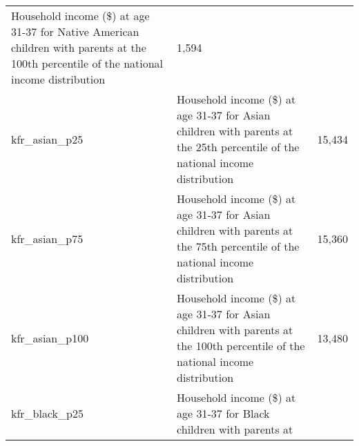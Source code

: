 \documentclass[]{book}
\begin{document}
\begin{longtable}[]{@{}lll@{}}
\begin{minipage}[t]{0.04\columnwidth}
Household income (\$) at age 31-37 for Native American children with
parents at the 100th percentile of the national income
distribution\strut
\end{minipage} & \begin{minipage}[t]{0.04\columnwidth}\raggedright\strut
1,594\strut
\end{minipage}\tabularnewline
\begin{minipage}[t]{0.04\columnwidth}\raggedright\strut
kfr\_asian\_p25\strut
\end{minipage} & \begin{minipage}[t]{0.04\columnwidth}\raggedright\strut
Household income (\$) at age 31-37 for Asian children with parents at
the 25th percentile of the national income distribution\strut
\end{minipage} & \begin{minipage}[t]{0.04\columnwidth}\raggedright\strut
15,434\strut
\end{minipage}\tabularnewline
\begin{minipage}[t]{0.04\columnwidth}\raggedright\strut
kfr\_asian\_p75\strut
\end{minipage} & \begin{minipage}[t]{0.04\columnwidth}\raggedright\strut
Household income (\$) at age 31-37 for Asian children with parents at
the 75th percentile of the national income distribution\strut
\end{minipage} & \begin{minipage}[t]{0.04\columnwidth}\raggedright\strut
15,360\strut
\end{minipage}\tabularnewline
\begin{minipage}[t]{0.04\columnwidth}\raggedright\strut
kfr\_asian\_p100\strut
\end{minipage} & \begin{minipage}[t]{0.04\columnwidth}\raggedright\strut
Household income (\$) at age 31-37 for Asian children with parents at
the 100th percentile of the national income distribution\strut
\end{minipage} & \begin{minipage}[t]{0.04\columnwidth}\raggedright\strut
13,480\strut
\end{minipage}\tabularnewline
\begin{minipage}[t]{0.04\columnwidth}\raggedright\strut
kfr\_black\_p25\strut
\end{minipage} & \begin{minipage}[t]{0.04\columnwidth}\raggedright\strut
Household income (\$) at age 31-37 for Black children with parents at

\end{minipage}
\end{longtable}
\end{document}
